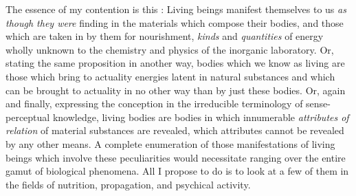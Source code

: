 \documentclass[a4paper, 11pt, oneside, polutonikogreek, english, landscape]{article}
\begin{document}
The essence of my contention is this : Living beings manifest themselves to us \emph{as though they were} finding in the materials which compose their bodies, and those which are taken in by them for nourishment, \emph{kinds} and \emph{quantities} of energy wholly unknown to the chemistry and physics of the inorganic laboratory. Or, stating the same proposition in another way, bodies which we know as living are those which bring to actuality energies latent in natural substances and which can be brought to actuality in no other way than by just these bodies. Or, again and finally, expressing the conception in the irreducible terminology of sense-perceptual knowledge, living bodies are bodies in which innumerable \emph{attributes of relation} of material substances are revealed, which attributes cannot be revealed by any other means. A complete enumeration of those manifestations of living beings which involve these peculiarities would necessitate ranging over the entire gamut of biological phenomena. All I propose to do is to look at a few of them in the fields of nutrition, propagation, and psychical activity.
\end{document}
